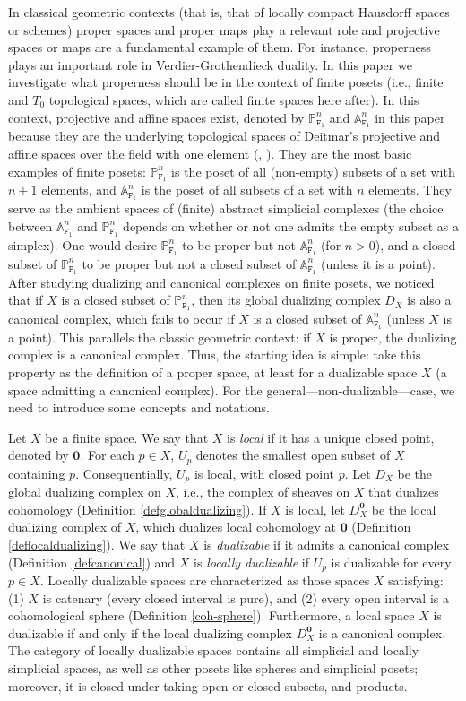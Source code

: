 \documentclass[amssymb,amscd,11pt,20pt]{amsart}
\newcommand{\FF}{{\mathtt F}}
\newcommand{\PP}{\mathbb P}
\newcommand{\0}{\mathbf 0}
\newcommand{\A}{{\mathbb A}}
\theoremstyle{plain}
\numberwithin{equation}{thm}
\begin{document}
In classical geometric contexts (that is, that of locally compact Hausdorff spaces or schemes) proper spaces and proper maps play a relevant role and projective spaces or maps are a fundamental example of them. For instance, properness plays an important role in Verdier-Grothendieck duality. In this paper we investigate what properness should be in the context of finite posets (i.e., finite and $T_0$ topological spaces, which are called finite spaces here after). In this context, projective and affine spaces exist, denoted by $\PP^n_{\FF_1}$ and $\A^n_{\FF_1}$ in this paper  because they are the underlying topological spaces of Deitmar's projective and affine spaces over the field with one element (\cite{Thas}, \cite{Deitmar}).  They are the most basic examples of finite posets: $\PP^n_{\FF_1}$ is the poset of all (non-empty) subsets of a set with $n+1$ elements, and $\A^n_{\FF_1}$ is the poset of all  subsets of a set with $n$ elements. They serve as the ambient spaces of (finite) abstract simplicial complexes (the choice between $\A^n_{\FF_1}$ and $\PP^n_{\FF_1}$   depends on whether  or not  one admits the empty subset as a simplex). One would desire $\PP^n_{\FF_1}$ to be proper but not $\A^n_{\FF_1}$ (for $n>0$), and a closed subset of $\PP^n_{\FF_1}$ to be proper but not a closed subset of $\A^n_{\FF_1}$ (unless it is a point). After studying dualizing and canonical complexes on finite posets, we noticed that if $X$ is  a closed subset of  $\PP^n_{\FF_1}$, then its global dualizing complex $D_X$ is also a canonical complex, which fails to occur if $X$ is a closed subset of $\A^n_{\FF_1}$ (unless $X$ is a point). This parallels the classic geometric context: if $X$ is proper, the dualizing complex is a canonical complex. Thus, the starting idea is simple: take this property as the definition of a proper space, at least for a dualizable space $X$ (a space admitting a canonical complex).  For the general—non-dualizable—case, we need to introduce some concepts and notations. 

Let $X$ be a finite space. We say that $X$ is {\emph {local}} if it has a unique closed point, denoted by $\0$. For each $p\in X$, $U_p$ denotes the smallest open subset of $X$ containing $p$. Consequentially, $U_p$ is local, with closed point $p$. Let $D_X$ be the global dualizing complex on $X$, i.e., the complex of sheaves on $X$ that dualizes cohomology (Definition \ref{defglobaldualizing}). If $X$ is local, let $D_X^\0$ be the local dualizing complex of $X$, which dualizes local cohomology at $\0$ (Definition \ref{deflocaldualizing}). We say that $X$ is \emph{dualizable} if it admits a canonical complex (Definition \ref{defcanonical}) and $X$ is \emph{locally dualizable} if $U_p$ is dualizable for every $p\in X$. Locally dualizable spaces are characterized as those spaces $X$ satisfying: (1) $X$ is catenary (every closed interval is pure), and (2) every open interval is a cohomological sphere (Definition \ref{coh-sphere}). Furthermore, a local space $X$ is dualizable if and only if the local dualizing complex $D_X^\0$ is a canonical complex. The category of locally dualizable spaces contains all simplicial and locally simplicial spaces, as well as other posets like spheres and simplicial posets; moreover,  it is closed under taking open or closed subsets, and products.
\end{document}
